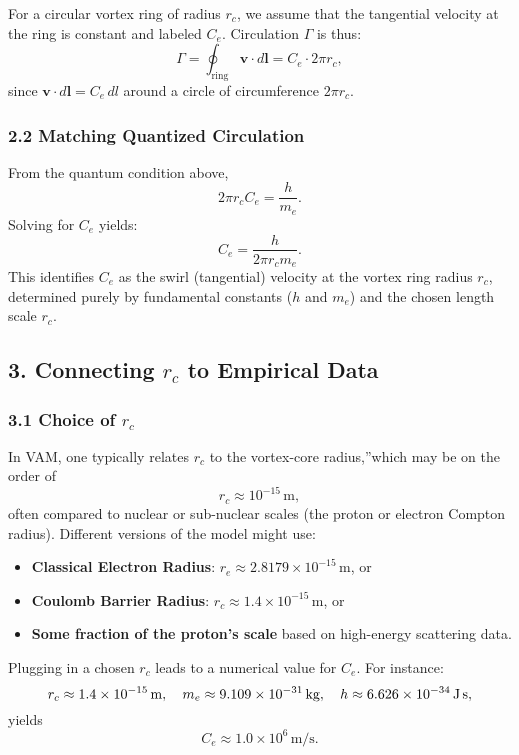 For a circular vortex ring of radius \(r_c\), we assume that the tangential velocity at the ring is constant and labeled \(C_e\). Circulation \(\Gamma\) is thus:
\[
    \Gamma = \oint_\text{ring} \mathbf{v} \cdot d\mathbf{l} = C_e \cdot 2 \pi r_c,
\]
since \(\mathbf{v} \cdot d\mathbf{l} = C_e \,dl\) around a circle of circumference \(2\pi r_c\).

\subsubsection*{2.2 Matching Quantized Circulation}

From the quantum condition above,
\[
    2 \pi r_c C_e = \frac{h}{m_e}.
\]
Solving for \(C_e\) yields:
\[
    C_e = \frac{h}{2 \pi r_c m_e}.
\]
This identifies \(C_e\) as the swirl (tangential) velocity at the vortex ring radius \(r_c\), determined purely by fundamental constants (\(h\) and \(m_e\)) and the chosen length scale \(r_c\).

\subsection*{3. Connecting \(r_c\) to Empirical Data}

\subsubsection*{3.1 Choice of \(r_c\)}

In VAM, one typically relates \(r_c\) to the \grqq vortex-core radius,\textquotedblright which may be on the order of
\[
    r_c \approx 10^{-15}\,\text{m},
\]
often compared to nuclear or sub-nuclear scales (the proton or electron Compton radius). Different versions of the model might use:
\begin{itemize}
    \item \textbf{Classical Electron Radius}: \(r_e \approx 2.8179 \times 10^{-15}\,\mathrm{m}\), or
    \item \textbf{Coulomb Barrier Radius}: \(r_c \approx 1.4 \times 10^{-15}\,\mathrm{m}\), or
    \item \textbf{Some fraction of the proton's scale} based on high-energy scattering data.
\end{itemize}

Plugging in a chosen \(r_c\) leads to a numerical value for \(C_e\). For instance:
\[
    r_c \approx 1.4 \times 10^{-15}\,\text{m}, \quad m_e \approx 9.109 \times 10^{-31}\,\text{kg}, \quad h \approx 6.626 \times 10^{-34}\,\text{J\,s},
\]
yields
\[
    C_e \approx 1.0 \times 10^6 \,\text{m/s}.
\]

